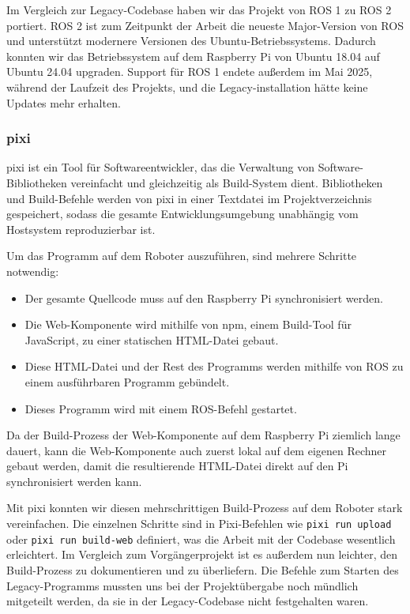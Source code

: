 Im Vergleich zur Legacy-Codebase haben wir das Projekt von ROS 1 zu ROS 2 portiert. ROS 2 ist zum Zeitpunkt der Arbeit die neueste Major-Version von ROS und unterstützt modernere Versionen des Ubuntu-Betriebssystems. Dadurch konnten wir das Betriebssystem auf dem Raspberry Pi von Ubuntu 18.04 auf Ubuntu 24.04 upgraden. Support für ROS 1 endete außerdem im Mai 2025, während der Laufzeit des Projekts, und die Legacy-installation hätte keine Updates mehr erhalten.

\subsubsection{pixi}

pixi ist ein Tool für Softwareentwickler, das die Verwaltung von Software-Bibliotheken vereinfacht und gleichzeitig als Build-System dient. Bibliotheken und Build-Befehle werden von pixi in einer Textdatei im Projektverzeichnis gespeichert, sodass die gesamte Entwicklungsumgebung unabhängig vom Hostsystem reproduzierbar ist.

Um das Programm auf dem Roboter auszuführen, sind mehrere Schritte notwendig:
\begin{itemize}
	\item Der gesamte Quellcode muss auf den Raspberry Pi synchronisiert werden.
	\item Die Web-Komponente wird mithilfe von npm, einem Build-Tool für JavaScript, zu einer statischen HTML-Datei gebaut.
	\item Diese HTML-Datei und der Rest des Programms werden mithilfe von ROS zu einem ausführbaren Programm gebündelt.
	\item Dieses Programm wird mit einem ROS-Befehl gestartet.
\end{itemize}

Da der Build-Prozess der Web-Komponente auf dem Raspberry Pi ziemlich lange dauert, kann die Web-Komponente auch zuerst lokal auf dem eigenen Rechner gebaut werden, damit die resultierende HTML-Datei direkt auf den Pi synchronisiert werden kann.

Mit pixi konnten wir diesen mehrschrittigen Build-Prozess auf dem Roboter stark vereinfachen. Die einzelnen Schritte sind in Pixi-Befehlen wie \texttt{pixi run upload} oder \texttt{pixi run build-web} definiert, was die Arbeit mit der Codebase wesentlich erleichtert. Im Vergleich zum Vorgängerprojekt ist es außerdem nun leichter, den Build-Prozess zu dokumentieren und zu überliefern. Die Befehle zum Starten des Legacy-Programms mussten uns bei der Projektübergabe noch mündlich mitgeteilt werden, da sie in der Legacy-Codebase nicht festgehalten waren.

